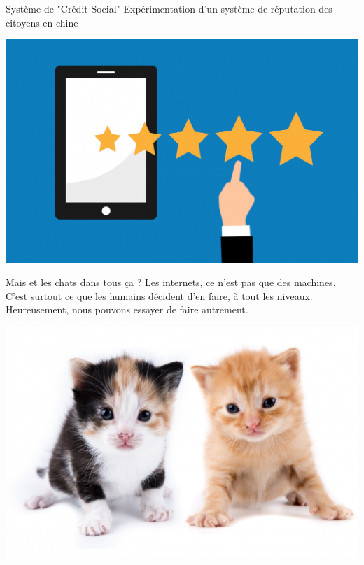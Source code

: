 \begin{frame}{Système de "Crédit Social"}
  Expérimentation d'un système de réputation des citoyens en chine

  \begin{center}
  \includegraphics[width=.7\textwidth]{usages/score.jpg}
  \end{center}
\end{frame}

\begin{frame}{Mais et les chats dans tous ça ?}
  \small
  Les internets, ce n'est pas que des machines.\\
  C'est surtout ce que les humains décident d'en faire, à tout les niveaux. \\

  Heureusement, nous pouvons essayer de faire autrement.

  \begin{center}
  \includegraphics[width=.7\textwidth]{usages/chatons.jpg}
  \end{center}
\end{frame}





